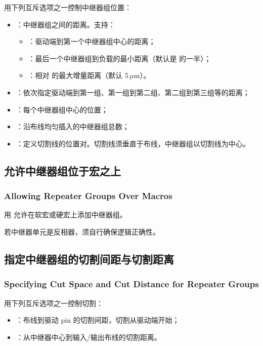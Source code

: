 用下列互斥选项之一控制中继器组位置：
\begin{itemize}
  \item {}：中继器组之间的距离。支持：
  \begin{itemize}
    \item {}：驱动端到第一个中继器组中心的距离；
    \item {}：最后一个中继器组到负载的最小距离（默认是  的一半）；
    \item {}：相对  的最大增量距离（默认 5\,$\mu$m）。
  \end{itemize}
  \item {}：依次指定驱动端到第一组、第一组到第二组、第二组到第三组等的距离；
  \item {}：每个中继器组中心的位置；
  \item {}：沿布线均匀插入的中继器组总数；
  \item {}：定义切割线的位置对。切割线须垂直于布线，中继器组以切割线为中心。
\end{itemize}

\subsection{允许中继器组位于宏之上}
\subsubsection*{Allowing Repeater Groups Over Macros}

用  允许在软宏或硬宏上添加中继器组。

\begin{noteBox}
若中继器单元是反相器，须自行确保逻辑正确性。
\end{noteBox}

\subsection{指定中继器组的切割间距与切割距离}
\subsubsection*{Specifying Cut Space and Cut Distance for Repeater Groups}

用下列互斥选项之一控制切割：
\begin{itemize}
  \item {}：布线到驱动 pin 的切割间距，切割从驱动端开始；
  \item {}：从中继器中心到输入/输出布线的切割距离。
\end{itemize}

